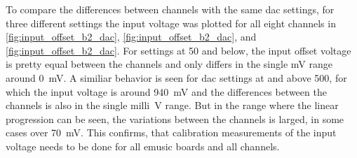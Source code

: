To compare the differences between channels with the same \ac{dac} settings, for three different settings the input voltage was plotted for all eight channels in \autoref{fig:input_offset_b2_dac}, \autoref{fig:input_offset_b2_dac}, and \autoref{fig:input_offset_b2_dac}.
For settings at \SI{50}{\dacu} and below, the input offset voltage is pretty equal between the channels and only differs in the single \si{\milli\volt} range around \SI{0}{\milli\volt}.
A similiar behavior is seen for \ac{dac} settings at and above \SI{500}{\dacu}, for which the input voltage is around \SI{940}{\milli\volt} and the differences between the channels is also in the single \si{milli\volt} range.
But in the \si{\dacu} range where the linear progression can be seen, the variations between the channels is larged, in some cases over \SI{70}{\milli\volt}.
This confirms, that calibration measurements of the input voltage needs to be done for all \ac{emusic} boards and all channels.
